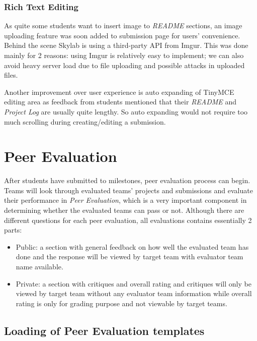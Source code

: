 \subsubsection{Rich Text Editing}

As quite some students want to insert image to \textit{README} sections, an image uploading feature was soon added to submission page for users' convenience. Behind the scene Skylab is using a third-party API from Imgur. This was done mainly for 2 reasons: using Imgur is relatively easy to implement; we can also avoid heavy server load due to file uploading and possible attacks in uploaded files.

Another improvement over user experience is auto expanding of TinyMCE editing area as feedback from students mentioned that their \textit{README} and \textit{Project Log} are usually quite lengthy. So auto expanding would not require too much scrolling during creating/editing a submission.

\section{Peer Evaluation} \label{peerevaluation}
 
 After students have submitted to milestones, peer evaluation process can begin. Teams will look through evaluated teams' projects and submissions and evaluate their performance in \textit{Peer Evaluation}, which is a very important component in determining whether the evaluated teams can pass or not. Although there are different questions for each peer evaluation, all evaluations contains essentially 2 parts:

 \begin{itemize}
  \item Public: a section with general feedback on how well the evaluated team has done and the response will be viewed by target team with evaluator team name available.
  \item Private: a section with critiques and overall rating and critiques will only be viewed by target team without any evaluator team information while overall rating is only for grading purpose and not viewable by target teams.
\end{itemize}

\subsection{Loading of Peer Evaluation templates}

